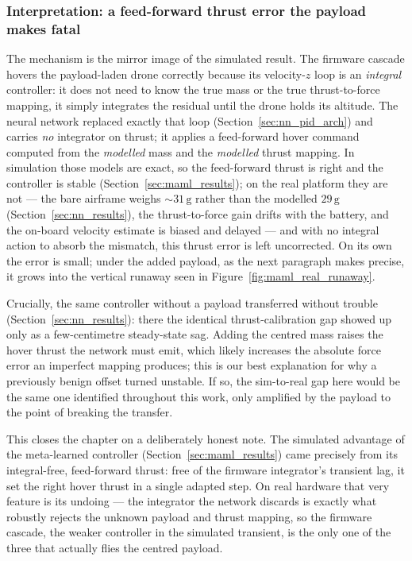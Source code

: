 \documentclass[11pt,a4paper]{article}
\theoremstyle{remark}
\numberwithin{equation}{section}
\begin{document}
\subsubsection*{Interpretation: a feed-forward thrust error the payload makes fatal}

The mechanism is the mirror image of the simulated result. The firmware cascade
hovers the payload-laden drone correctly because its velocity-$z$ loop is an
\emph{integral} controller: it does not need to know the true mass or the true
thrust-to-force mapping, it simply integrates the residual until the drone holds
its altitude. The neural network replaced exactly that loop
(Section~\ref{sec:nn_pid_arch}) and carries \emph{no} integrator on thrust; it
applies a feed-forward hover command computed from the \emph{modelled} mass and
the \emph{modelled} thrust mapping. In simulation those models are exact, so the
feed-forward thrust is right and the controller is stable
(Section~\ref{sec:maml_results}); on the real platform they are not --- the bare
airframe weighs $\sim\!31\,\mathrm{g}$ rather than the modelled $29\,\mathrm{g}$
(Section~\ref{sec:nn_results}), the thrust-to-force gain drifts with the battery,
and the on-board velocity estimate is biased and delayed --- and with no integral
action to absorb the mismatch, this thrust error is left uncorrected. On its own
the error is small; under the added payload, as the next paragraph makes precise,
it grows into the vertical runaway seen in Figure~\ref{fig:maml_real_runaway}.

Crucially, the same controller without a payload transferred without trouble
(Section~\ref{sec:nn_results}): there the identical thrust-calibration gap showed
up only as a few-centimetre steady-state sag. Adding the centred mass raises the
hover thrust the network must emit, which likely increases the absolute force error
an imperfect mapping produces; this is our best explanation for why a previously
benign offset turned unstable. If so, the sim-to-real gap here would be the same
one identified throughout this work, only amplified by the payload to the point of
breaking the transfer.

This closes the chapter on a deliberately honest note. The simulated advantage of
the meta-learned controller (Section~\ref{sec:maml_results}) came precisely from
its integral-free, feed-forward thrust: free of the firmware integrator's
transient lag, it set the right hover thrust in a single adapted step. On real
hardware that very feature is its undoing --- the integrator the network discards
is exactly what robustly rejects the unknown payload and thrust mapping, so the
firmware cascade, the weaker controller in the simulated transient, is the only
one of the three that actually flies the centred payload.
\end{document}
